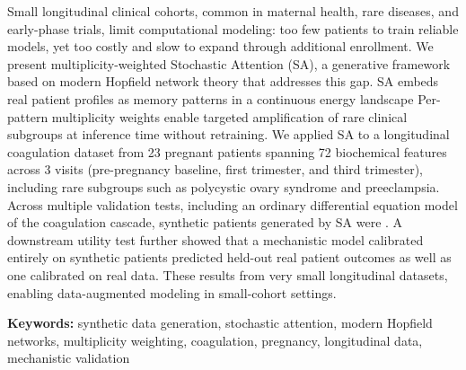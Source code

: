 Small longitudinal clinical cohorts, common in maternal health, rare diseases, and
early-phase trials, limit computational modeling: too few
patients to train reliable models, yet too costly and slow to expand through
additional enrollment. We present multiplicity-weighted Stochastic Attention (SA), a
generative framework based on modern Hopfield network theory that addresses this
gap. SA embeds real patient profiles as memory patterns in a continuous energy
landscape  Per-pattern multiplicity weights enable targeted amplification of rare
clinical subgroups at inference time without retraining. We applied SA to a
longitudinal coagulation dataset from 23 pregnant patients spanning 72 biochemical
features across 3 visits (pre-pregnancy baseline, first trimester, and third
trimester), including rare subgroups such as polycystic ovary syndrome and
preeclampsia. Across multiple validation tests, including an ordinary differential
equation model of the coagulation cascade, synthetic patients generated by SA were
. A downstream utility test further showed
that a mechanistic model calibrated entirely on synthetic patients predicted held-out
real patient outcomes as well as one calibrated on real data. These results
from very small longitudinal datasets, enabling data-augmented modeling in small-cohort settings.

\medskip
\noindent\textbf{Keywords:} synthetic data generation, stochastic attention, modern Hopfield networks,
multiplicity weighting, coagulation, pregnancy, longitudinal data, mechanistic validation
